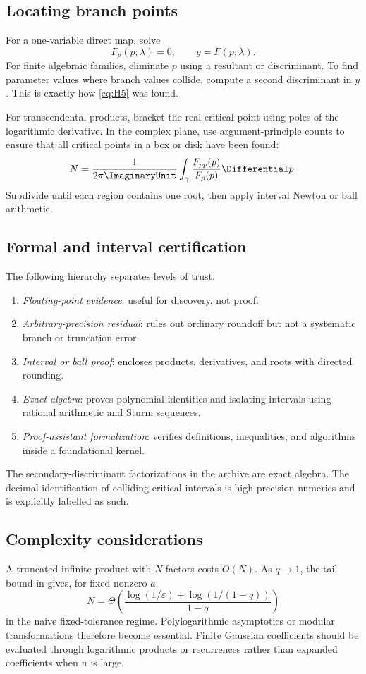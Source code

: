 \documentclass[11pt,oneside]{article}
\theoremstyle{definition}
\theoremstyle{remark}
\theoremstyle{plain}
\theoremstyle{definition}
\theoremstyle{remark}
\numberwithin{equation}{section}
\numberwithin{figure}{section}
\numberwithin{table}{section}
\let\reportsubsection\subsection
\let\reportsubsubsection\subsubsection
\let\section\reportsubsection
\let\subsection\reportsubsubsection
\begin{document}
\section{Locating branch points}
For a one-variable direct map, solve
\[
 F_p(p;\lambda)=0,
 \qquad
 y=F(p;\lambda).
\]
For finite algebraic families, eliminate \(p\) using a resultant or
discriminant.  To find parameter values where branch values collide, compute a
second discriminant in \(y\).  This is exactly how
\eqref{eq:H5} was found.

For transcendental products, bracket the real critical point using poles of the
logarithmic derivative.  In the complex plane, use argument-principle counts to
ensure that all critical points in a box or disk have been found:
\[
 N=\frac1{2\pi\ImaginaryUnit}\int_\gamma\frac{F_{pp}(p)}{F_p(p)}\Differential p.
\]
Subdivide until each region contains one root, then apply interval Newton or
ball arithmetic.

\section{Formal and interval certification}
The following hierarchy separates levels of trust.
\begin{enumerate}[label=(\roman*)]
\item \emph{Floating-point evidence}: useful for discovery, not proof.
\item \emph{Arbitrary-precision residual}: rules out ordinary roundoff but not a
systematic branch or truncation error.
\item \emph{Interval or ball proof}: encloses products, derivatives, and roots
with directed rounding.
\item \emph{Exact algebra}: proves polynomial identities and isolating intervals
using rational arithmetic and Sturm sequences.
\item \emph{Proof-assistant formalization}: verifies definitions, inequalities,
and algorithms inside a foundational kernel.
\end{enumerate}
The secondary-discriminant factorizations in the archive are exact algebra.
The decimal identification of colliding critical intervals is high-precision
numerics and is explicitly labelled as such.

\section{Complexity considerations}
A truncated infinite product with \(N\) factors costs \(O(N)\).  As \(q\to1\),
the tail bound in  gives, for fixed nonzero \(a\),
\[
 N=\Theta\!\left(\frac{\log(1/\varepsilon)+\log(1/(1-q))}{1-q}\right)
\]
in the naive fixed-tolerance regime.  Polylogarithmic asymptotics or modular
transformations therefore become essential.
Finite Gaussian coefficients should be evaluated through logarithmic products
or recurrences rather than expanded coefficients when \(n\) is large.
\end{document}
